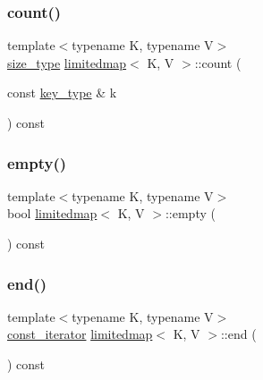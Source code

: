 \mbox{\label{classlimitedmap_adc3168f5a48a8b5e13a1c45decb70834}} 
\subsubsection{\texorpdfstring{count()}{count()}}
{\footnotesize\ttfamily template$<$typename K, typename V$>$ \\
\mbox{\hyperlink{classlimitedmap_a1c564b323f94e182e56aa27975e5f9d1}{size\+\_\+type}} \mbox{\hyperlink{classlimitedmap}{limitedmap}}$<$ K, V $>$\+::count (\begin{DoxyParamCaption}\item[{const \mbox{\hyperlink{classlimitedmap_aebf71255c65df699225cdcefe88717b9}{key\+\_\+type}} \&}]{k }\end{DoxyParamCaption}) const\hspace{0.3cm}{\ttfamily [inline]}}

\mbox{\label{classlimitedmap_ac93bddc5df19889386fb4094ad117ca6}} 
\subsubsection{\texorpdfstring{empty()}{empty()}}
{\footnotesize\ttfamily template$<$typename K, typename V$>$ \\
bool \mbox{\hyperlink{classlimitedmap}{limitedmap}}$<$ K, V $>$\+::empty (\begin{DoxyParamCaption}{ }\end{DoxyParamCaption}) const\hspace{0.3cm}{\ttfamily [inline]}}

\mbox{\label{classlimitedmap_a5d4fe21081932bc9bd8268c849a00540}} 
\subsubsection{\texorpdfstring{end()}{end()}}
{\footnotesize\ttfamily template$<$typename K, typename V$>$ \\
\mbox{\hyperlink{classlimitedmap_ab0a3e4f2ec7c82359300c83a35ae2500}{const\+\_\+iterator}} \mbox{\hyperlink{classlimitedmap}{limitedmap}}$<$ K, V $>$\+::end (\begin{DoxyParamCaption}{ }\end{DoxyParamCaption}) const\hspace{0.3cm}{\ttfamily [inline]}}

